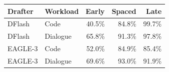 \begin{tabular}{llrrr}
\toprule
Drafter & Workload & Early & Spaced & Late \\
\midrule
DFlash & Code & 40.5\% & 84.8\% & 99.7\% \\
DFlash & Dialogue & 65.8\% & 91.3\% & 97.8\% \\
EAGLE-3 & Code & 52.0\% & 84.9\% & 85.4\% \\
EAGLE-3 & Dialogue & 69.6\% & 93.0\% & 91.9\% \\
\bottomrule
\end{tabular}
